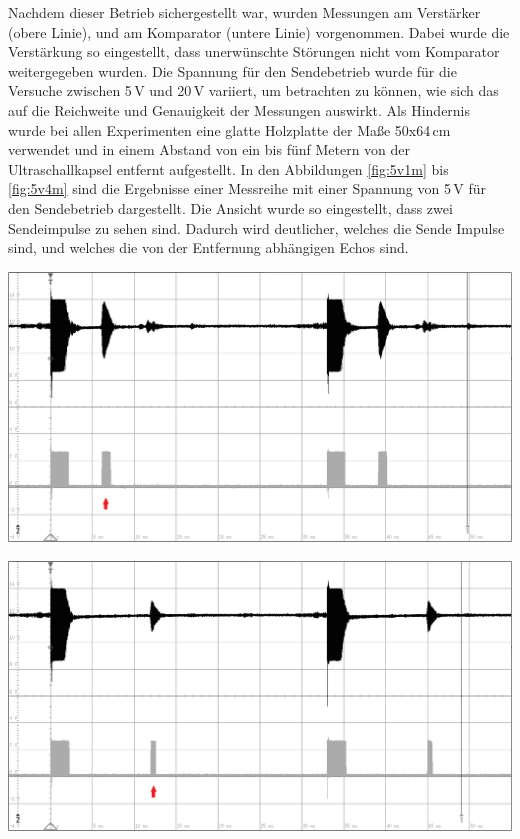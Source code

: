 Nachdem dieser Betrieb sichergestellt war, wurden Messungen am Verstärker (obere Linie), und am Komparator (untere Linie) vorgenommen. Dabei wurde die Verstärkung so eingestellt, dass unerwünschte Störungen nicht vom Komparator weitergegeben wurden. Die Spannung für den Sendebetrieb wurde für die Versuche zwischen 5\,V und 20\,V variiert, um betrachten zu können, wie sich das auf die Reichweite und Genauigkeit der Messungen auswirkt. Als Hindernis wurde bei allen Experimenten eine glatte Holzplatte der Maße 50x64\,cm verwendet und in einem Abstand von ein bis fünf Metern von der Ultraschallkapsel entfernt aufgestellt. In den Abbildungen \ref{fig:5v1m} bis \ref{fig:5v4m} sind die Ergebnisse einer Messreihe mit einer Spannung von 5\,V für den Sendebetrieb dargestellt. Die Ansicht wurde so eingestellt, dass zwei Sendeimpulse zu sehen sind. Dadurch wird deutlicher, welches die Sende Impulse sind, und welches die von der Entfernung abhängigen Echos sind.\\
\begin{minipage}{0.46\textwidth}
\includegraphics[width=1\textwidth%
]{Abbildungen/MessungenP2/5V/1mb.PNG}
\label{fig:5v1m}
\end{minipage}\qquad
\begin{minipage}{0.46\textwidth}
\includegraphics[width=1\textwidth%
]{Abbildungen/MessungenP2/5V/2mb.PNG}
\label{fig:5v2m}
\end{minipage}\\
